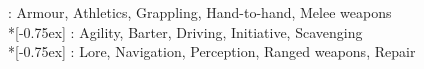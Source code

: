 
{\footnotesize
{}: Armour, Athletics, Grappling, Hand-to-hand, Melee weapons \\*[-0.75ex]
: Agility, Barter, Driving, Initiative, Scavenging \\*[-0.75ex]
: Lore, Navigation, Perception, Ranged weapons, Repair}
